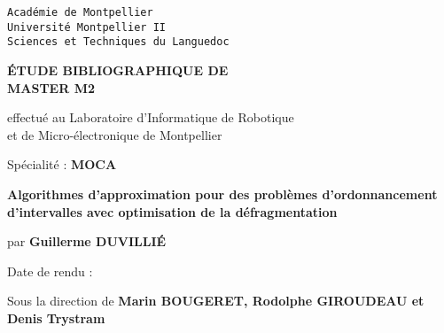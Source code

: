 \pagestyle{fancyplain}
\thispagestyle{empty}
\noindent
\begin{center}
\large{\texttt{Académie de Montpellier}}\\
\Large{\texttt{Université Montpellier II}}\\
\large{\texttt{Sciences et Techniques du Languedoc}}\\
\end{center}

\vspace{1cm}

\begin{center}
\Huge{\textbf{\'{E}TUDE BIBLIOGRAPHIQUE DE\\}}
 \vspace{1.0cm}
\Huge{\textbf{MASTER M2}}
\normalsize
\begin{center}
\vspace{1.0cm}

effectué au Laboratoire d'Informatique de Robotique\\
et de Micro-électronique de Montpellier
\end{center}

\vspace{2mm}

\vspace{0.1cm}
\normalsize

\vspace{3mm}

\large{Spécialité} : \textbf{MOCA}\\
\vspace{1.0cm}

\LARGE{\textbf{Algorithmes d'approximation pour des problèmes d'ordonnancement d'intervalles
avec optimisation de la défragmentation}}
\vspace{2mm}

\begin{center}
  par \textbf{Guillerme DUVILLIÉ}
\end{center}

\vspace{2mm}



\vspace{4cm}

Date de rendu : \textbf{}

\vspace{0.5cm}

Sous la direction de \textbf{Marin BOUGERET, Rodolphe GIROUDEAU et Denis Trystram}

\vspace{5mm}




\end{center}
\newpage
